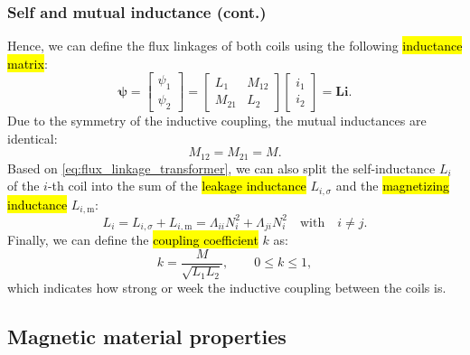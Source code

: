 \begin{frame}
	\frametitle{Self and mutual inductance (cont.)}
	Hence, we can define the flux linkages of both coils using the following \hl{inductance matrix}:
	\begin{equation}
		\bm{\psi} = \begin{bmatrix} \psi_1 \\ \psi_2 \end{bmatrix} = \begin{bmatrix} L_1 & M_{12} \\ M_{21} & L_2 \end{bmatrix} \begin{bmatrix} i_1 \\ i_2 \end{bmatrix} = \bm{L}\bm{i}.
		\label{eq:flux_linkage_matrix_transformer}
	\end{equation}
	\pause
	Due to the symmetry of the inductive coupling, the mutual inductances are identical:
	\begin{equation}
		M_{12} = M_{21} = M.
	\end{equation}
	\pause
	Based on \eqref{eq:flux_linkage_transformer}, we can also split the self-inductance $L_i$ of the $i$-th coil into the sum of the \hl{leakage inductance} $L_{i,\sigma}$ and the \hl{magnetizing inductance} $L_{i,\mathrm{m}}$:
	\begin{equation}
		L_i = L_{i,\sigma} + L_{i,\mathrm{m}} = \Lambda_{ii}N_i^2 + \Lambda_{ji}N_i^2 \quad \mbox{with} \quad i \neq j.
		\label{eq:inductance_split}
	\end{equation}
	\pause
	Finally, we can define the \hl{coupling coefficient} $k$ as:
	\begin{equation}
		k = \frac{M}{\sqrt{L_1 L_2}}, \qquad 0 \leq k \leq 1,
		\label{eq:coupling_coefficient}
	\end{equation}
	which indicates how strong or week the inductive coupling between the coils is.
\end{frame}

\subsection{Magnetic material properties}


